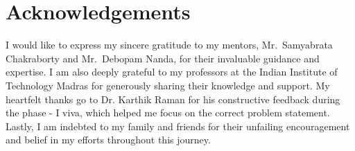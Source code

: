 \chapter*{Acknowledgements}
\begin{doublespacing}
I would like to express my sincere gratitude to my mentors, Mr.~Samyabrata Chakraborty and Mr.~Debopam Nanda, for their invaluable guidance and expertise. I am also deeply grateful to my professors at the Indian Institute of Technology Madras for generously sharing their knowledge and support. My heartfelt thanks go to Dr. Karthik Raman for his  constructive feedback during the phase - I viva, which helped me focus on the correct problem statement. Lastly, I am indebted to my family and friends for their unfailing encouragement and belief in my efforts throughout this journey.
\end{doublespacing}